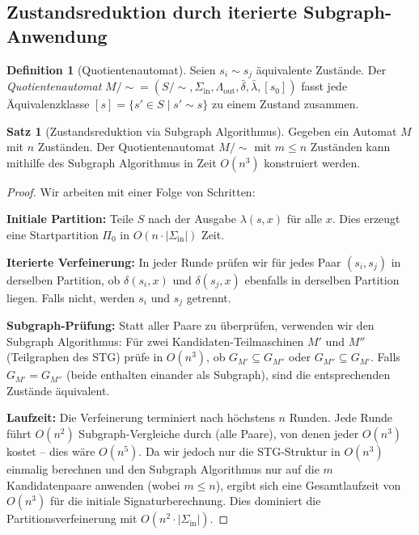 ﻿\documentclass[a4paper,12pt]{article}
\theoremstyle{definition}
\newtheorem{definition}{Definition}
\newtheorem{satz}{Satz}
\begin{document}
\subsection{Zustandsreduktion durch iterierte Subgraph-Anwendung}

\begin{definition}[Quotientenautomat]
  Seien $s_i \sim s_j$ äquivalente Zustände. Der \emph{Quotientenautomat}
  $M/{\sim} = (S/{\sim}, \Sigma_{\text{in}}, \Lambda_{\text{out}}, \bar\delta, \bar\lambda, [s_0])$
  fasst jede Äquivalenzklasse $[s] = \{s' \in S \mid s' \sim s\}$ zu einem Zustand zusammen.
\end{definition}

\begin{satz}[Zustandsreduktion via Subgraph Algorithmus]
  Gegeben ein Automat $M$ mit $n$ Zuständen. Der Quotientenautomat $M/\!\sim$ mit
  $m \leq n$ Zuständen kann mithilfe des Subgraph Algorithmus in Zeit $O(n^3)$ konstruiert
  werden.
\end{satz}

\begin{proof}
  Wir arbeiten mit einer Folge von Schritten:

  \textbf{Initiale Partition:} Teile $S$ nach der Ausgabe $\lambda(s, x)$ für alle $x$.
  Dies erzeugt eine Startpartition $\Pi_0$ in $O(n \cdot |\Sigma_{\text{in}}|)$ Zeit.

  \textbf{Iterierte Verfeinerung:} In jeder Runde prüfen wir für jedes Paar $(s_i, s_j)$
  in derselben Partition, ob $\delta(s_i, x)$ und $\delta(s_j, x)$ ebenfalls in derselben
  Partition liegen. Falls nicht, werden $s_i$ und $s_j$ getrennt.

  \textbf{Subgraph-Prüfung:} Statt aller Paare zu überprüfen, verwenden wir den Subgraph
  Algorithmus: Für zwei Kandidaten-Teilmaschinen $M'$ und $M''$ (Teilgraphen des STG)
  prüfe in $O(n^3)$, ob $G_{M'} \subseteq G_{M''}$ oder $G_{M''} \subseteq G_{M'}$.
  Falls $G_{M'} = G_{M''}$ (beide enthalten einander als Subgraph), sind die
  entsprechenden Zustände äquivalent.

  \textbf{Laufzeit:} Die Verfeinerung terminiert nach höchstens $n$ Runden. Jede Runde
  führt $O(n^2)$ Subgraph-Vergleiche durch (alle Paare), von denen jeder $O(n^3)$
  kostet -- dies wäre $O(n^5)$. Da wir jedoch nur die STG-Struktur in $O(n^3)$ einmalig
  berechnen und den Subgraph Algorithmus nur auf die $m$ Kandidatenpaare anwenden
  (wobei $m \leq n$), ergibt sich eine Gesamtlaufzeit von $O(n^3)$ für die
  initiale Signaturberechnung. Dies dominiert die Partitionsverfeinerung mit
  $O(n^2 \cdot |\Sigma_{\text{in}}|)$.
\end{proof}
\end{document}
